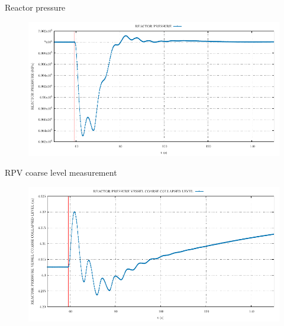 \begin{frame}{Reactor pressure}
	\begin{figure}
		\centering
		\includegraphics[width=\textwidth]{./graphs/REACTOR PRESSURE_comp.pdf}
		
	\end{figure}
	
\end{frame}
\begin{frame}{RPV coarse level measurement}
	\begin{figure}
		\centering
		\includegraphics[width=\textwidth]{./graphs/REACTOR PRESSURE VESSEL COARSE COLLAPSED LEVEL_comp.pdf}
		
	\end{figure}
	
\end{frame}

